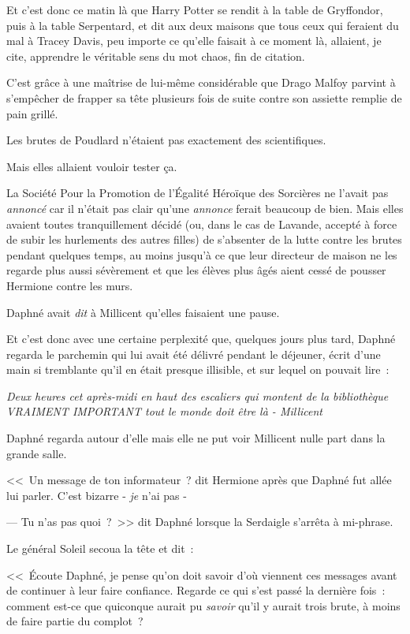 \later

Et c'est donc ce matin là que Harry Potter se rendit à la table de Gryffondor, puis à la table Serpentard, et dit aux deux maisons que tous ceux qui feraient du mal à Tracey Davis, peu importe ce qu'elle faisait à ce moment là, allaient, je cite, apprendre le véritable sens du mot chaos, fin de citation.

C'est grâce à une maîtrise de lui-même considérable que Drago Malfoy parvint à s'empêcher de frapper sa tête plusieurs fois de suite contre son assiette remplie de pain grillé.

Les brutes de Poudlard n'étaient pas exactement des scientifiques.

Mais elles allaient vouloir tester ça.

\later

La Société Pour la Promotion de l'Égalité Héroïque des Sorcières ne l'avait pas \emph{annoncé} car il n'était pas clair qu'une \emph{annonce} ferait beaucoup de bien. Mais elles avaient toutes tranquillement décidé (ou, dans le cas de Lavande, accepté à force de subir les hurlements des autres filles) de s'absenter de la lutte contre les brutes pendant quelques temps, au moins jusqu'à ce que leur directeur de maison ne les regarde plus aussi sévèrement et que les élèves plus âgés aient cessé de pousser Hermione contre les murs.

Daphné avait \emph{dit} à Millicent qu'elles faisaient une pause.

Et c'est donc avec une certaine perplexité que, quelques jours plus tard, Daphné regarda le parchemin qui lui avait été délivré pendant le déjeuner, écrit d'une main si tremblante qu'il en était presque illisible, et sur lequel on pouvait lire~:

\emph{Deux heures cet après-midi en haut des escaliers qui montent de la bibliothèque VRAIMENT IMPORTANT tout le monde doit être là - Millicent}

Daphné regarda autour d'elle mais elle ne put voir Millicent nulle part dans la grande salle.

<<~Un message de ton informateur~? dit Hermione après que Daphné fut allée lui parler. C'est bizarre - \emph{je} n'ai pas -

--- Tu n'as pas quoi~?~>> dit Daphné lorsque la Serdaigle s'arrêta à mi-phrase.

Le général Soleil secoua la tête et dit~:

<<~Écoute Daphné, je pense qu'on doit savoir d'où viennent ces messages avant de continuer à leur faire confiance. Regarde ce qui s'est passé la dernière fois~: comment est-ce que quiconque aurait pu \emph{savoir} qu'il y aurait trois brute, à moins de faire partie du complot~?

